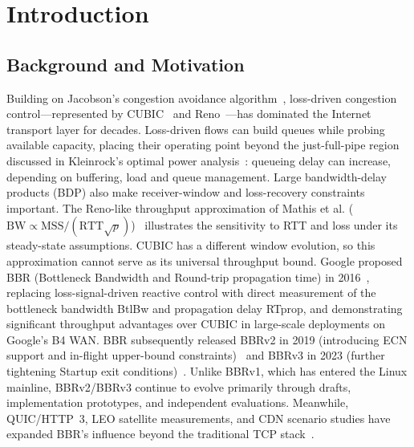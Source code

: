 \documentclass[a4paper,fleqn]{cas-sc}
\begin{document}
\section{Introduction}
\label{sec:intro}

\subsection{Background and Motivation}
\label{sec:background}

Building on Jacobson's congestion avoidance algorithm~\citep{jacobson1988congestion},
loss-driven congestion control---represented by CUBIC~\citep{ha2008cubic} and
Reno~\citep{fall1996simulation}---has dominated the Internet transport layer for
decades. Loss-driven flows can build queues while probing available capacity,
placing their operating point beyond the just-full-pipe region discussed
in Kleinrock's optimal power analysis~\citep{kleinrock1979power}: queueing delay can increase, depending on buffering, load and queue
management. Large bandwidth-delay products (BDP) also make receiver-window
and loss-recovery constraints important. The Reno-like throughput approximation of Mathis et al.
($\mathrm{BW}\propto\mathrm{MSS}/(\mathrm{RTT}\sqrt{p})$)~\citep{mathis1997macroscopic}
illustrates the sensitivity to RTT and loss under its steady-state assumptions.
CUBIC has a different window evolution, so this approximation cannot serve
as its universal throughput bound.
Google proposed BBR (Bottleneck Bandwidth and
Round-trip propagation time) in 2016~\citep{cardwell2017bbr}, replacing
loss-signal-driven reactive control with direct measurement of the bottleneck
bandwidth BtlBw and propagation delay RTprop, and demonstrating significant
throughput advantages over CUBIC in large-scale deployments on Google's B4 WAN.
BBR subsequently released BBRv2 in 2019 (introducing ECN support and in-flight
upper-bound constraints)~\citep{cardwell2019bbrv2} and BBRv3 in 2023 (further
tightening Startup exit conditions)~\citep{cardwell2023bbrv3}. Unlike BBRv1,
which has entered the Linux mainline, BBRv2/BBRv3 continue to evolve primarily
through drafts, implementation prototypes, and independent evaluations. Meanwhile,
QUIC/HTTP~3, LEO satellite measurements, and CDN scenario studies have expanded
BBR's influence beyond the traditional TCP
stack~\citep{rfc9000,rfc9002,rfc9114,deutschmann2023starlink,kamel2024starquic}.
\end{document}
